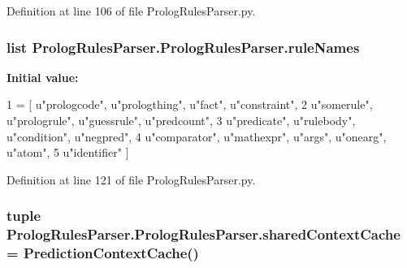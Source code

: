 Definition at line 106 of file Prolog\+Rules\+Parser.\+py.

\hypertarget{class_prolog_rules_parser_1_1_prolog_rules_parser_a0faf0fd8785bbe611ec4bc517ca0387a}{}
\subsubsection[{rule\+Names}]{\setlength{\rightskip}{0pt plus 5cm}list Prolog\+Rules\+Parser.\+Prolog\+Rules\+Parser.\+rule\+Names\hspace{0.3cm}{\ttfamily [static]}}\label{class_prolog_rules_parser_1_1_prolog_rules_parser_a0faf0fd8785bbe611ec4bc517ca0387a}
{\bfseries Initial value\+:}
\begin{DoxyCode}
1 = [ \textcolor{stringliteral}{u"prologcode"}, \textcolor{stringliteral}{u"prologthing"}, \textcolor{stringliteral}{u"fact"}, \textcolor{stringliteral}{u"constraint"}, 
2                    \textcolor{stringliteral}{u"somerule"}, \textcolor{stringliteral}{u"prologrule"}, \textcolor{stringliteral}{u"guessrule"}, \textcolor{stringliteral}{u"predcount"}, 
3                    \textcolor{stringliteral}{u"predicate"}, \textcolor{stringliteral}{u"rulebody"}, \textcolor{stringliteral}{u"condition"}, \textcolor{stringliteral}{u"negpred"}, 
4                    \textcolor{stringliteral}{u"comparator"}, \textcolor{stringliteral}{u"mathexpr"}, \textcolor{stringliteral}{u"args"}, \textcolor{stringliteral}{u"onearg"}, \textcolor{stringliteral}{u"atom"}, 
5                    \textcolor{stringliteral}{u"identifier"} ]
\end{DoxyCode}


Definition at line 121 of file Prolog\+Rules\+Parser.\+py.

\hypertarget{class_prolog_rules_parser_1_1_prolog_rules_parser_abcc83c78b7cb5aff6b2cc54f5d33f143}{}
\subsubsection[{shared\+Context\+Cache}]{\setlength{\rightskip}{0pt plus 5cm}tuple Prolog\+Rules\+Parser.\+Prolog\+Rules\+Parser.\+shared\+Context\+Cache = Prediction\+Context\+Cache()\hspace{0.3cm}{\ttfamily [static]}}\label{class_prolog_rules_parser_1_1_prolog_rules_parser_abcc83c78b7cb5aff6b2cc54f5d33f143}


